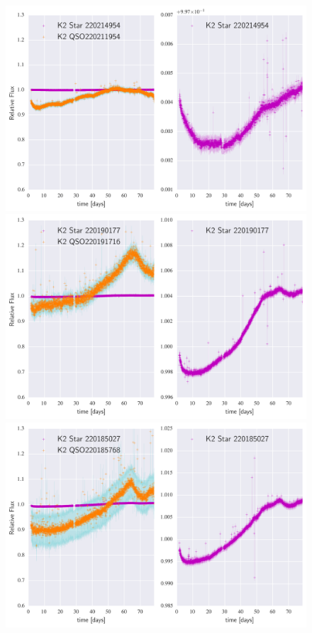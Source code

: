 \documentclass[a4paper,fleqn,usenatbib]{mnras}
\begin{document}
          
       \begin{figure}
  	\includegraphics[width=\columnwidth]{220211954NearestNeighbor.png}
  	\includegraphics[width=\columnwidth]{220191716NearestNeighbor.png}
  	\includegraphics[width=\columnwidth]{220185768NearestNeighbor.png}
       	\caption{}
       	\label{fig:example_figure}
       \end{figure}                
          
\end{document}
